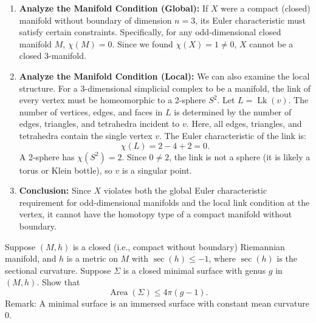 \begin{solution}
\begin{enumerate}
    \item \textbf{Analyze the Manifold Condition (Global):}
    If $X$ were a compact (closed) manifold without boundary of dimension $n=3$, its Euler characteristic must satisfy certain constraints. Specifically, for any odd-dimensional closed manifold $M$, $\chi(M) = 0$.
    Since we found $\chi(X) = 1 \neq 0$, $X$ cannot be a closed 3-manifold.
    
    \item \textbf{Analyze the Manifold Condition (Local):}
    We can also examine the local structure. For a 3-dimensional simplicial complex to be a manifold, the link of every vertex must be homeomorphic to a 2-sphere $S^2$. Let $L = \operatorname{Lk}(v)$.
    The number of vertices, edges, and faces in $L$ is determined by the number of edges, triangles, and tetrahedra incident to $v$. Here, all edges, triangles, and tetrahedra contain the single vertex $v$.
    The Euler characteristic of the link is:
    \[ \chi(L) = 2 - 4 + 2 = 0. \]
    A 2-sphere has $\chi(S^2) = 2$. Since $0 \neq 2$, the link is not a sphere (it is likely a torus or Klein bottle), so $v$ is a singular point.
    
    \item \textbf{Conclusion:}
    Since $X$ violates both the global Euler characteristic requirement for odd-dimensional manifolds and the local link condition at the vertex, it cannot have the homotopy type of a compact manifold without boundary.
\end{enumerate}
\end{solution}

\begin{exercise}
\label{geometry:2022:2}
Suppose $(M, h)$ is a closed (i.e., compact without boundary) Riemannian manifold, and $h$ is a metric on $M$ with $\sec(h) \leq -1$, where $\sec(h)$ is the sectional curvature. Suppose $\Sigma$ is a closed minimal surface with genus $g$ in $(M, h)$. Show that
$$
\operatorname{Area} (\Sigma) \leq 4 \pi (g - 1).
$$
Remark: A minimal surface is an immersed surface with constant mean curvature 0.
\end{exercise}

